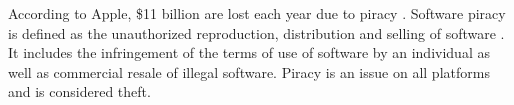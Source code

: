 According to Apple, \$11 billion are lost each year due to piracy \cite{applePiracy}.
Software piracy is defined as the unauthorized reproduction, distribution and selling of software \cite{applePiracy}.
It includes the infringement of the terms of use of software by an individual as well as commercial resale of illegal software.
Piracy is an issue on all platforms and is considered theft.
